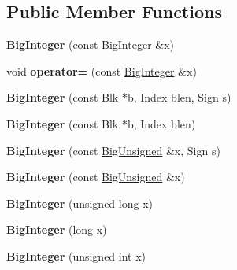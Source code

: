 \subsection*{Public Member Functions}
\begin{DoxyCompactItemize}
\item 
\mbox{\label{class_big_integer_a77b04c7f78cc5f1c0ff8a6e6d0f70a8c}} 
{\bfseries Big\+Integer} (const \mbox{\hyperlink{class_big_integer}{Big\+Integer}} \&x)
\item 
\mbox{\label{class_big_integer_affcbb8c78dde021b8dc86f85043f3874}} 
void {\bfseries operator=} (const \mbox{\hyperlink{class_big_integer}{Big\+Integer}} \&x)
\item 
\mbox{\label{class_big_integer_a07a3ffaacf8ec61365f476c54944a94c}} 
{\bfseries Big\+Integer} (const Blk $\ast$b, Index blen, Sign s)
\item 
\mbox{\label{class_big_integer_a8f7da854813b9f0e1999a5f70f5951f8}} 
{\bfseries Big\+Integer} (const Blk $\ast$b, Index blen)
\item 
\mbox{\label{class_big_integer_abd4e98ccd5f181fd89d4fb1b26706890}} 
{\bfseries Big\+Integer} (const \mbox{\hyperlink{class_big_unsigned}{Big\+Unsigned}} \&x, Sign s)
\item 
\mbox{\label{class_big_integer_a37ec8eaf922f22f06c2d7c3f0fd6c947}} 
{\bfseries Big\+Integer} (const \mbox{\hyperlink{class_big_unsigned}{Big\+Unsigned}} \&x)
\item 
\mbox{\label{class_big_integer_a4d7fc4b1ef1fa49acefa17b5c4d54a41}} 
{\bfseries Big\+Integer} (unsigned long x)
\item 
\mbox{\label{class_big_integer_a8204216b947c1f7d55055fbcdce537e5}} 
{\bfseries Big\+Integer} (long x)
\item 
\mbox{\label{class_big_integer_a84e3afc544182aec037f803a78f7c870}} 
{\bfseries Big\+Integer} (unsigned int x)
\item 
\mbox{\label{class_big_integer_aa640cbe9e15ef5336b3fb392a33774e1}} 

\end{DoxyCompactItemize}
